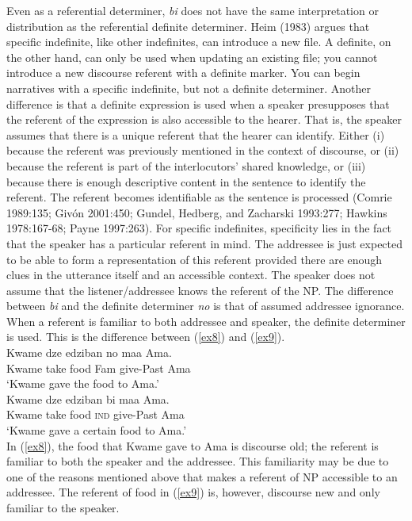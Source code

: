 \documentclass[output=paper,
modfonts
]{langsci/langscibook}
\begin{document}
Even as a referential determiner, \emph{bi} does not have the same interpretation or distribution as the referential definite determiner. Heim (1983) argues that specific indefinite, like other indefinites, can introduce a new file. A definite, on the other hand, can only be used when updating an existing file; you cannot introduce a new discourse referent with a definite marker. You can begin narratives with a specific indefinite, but not a definite determiner. Another difference is that a definite expression is used when a speaker presupposes that the referent of the expression is also accessible to the hearer. That is, the speaker assumes that there is a unique referent that the hearer can identify. Either (i) because the referent was previously mentioned in the context of discourse, or (ii) because the referent is part of the interlocutors’ shared knowledge, or (iii) because there is enough descriptive content in the sentence to identify the referent.  The referent becomes identifiable as the sentence is processed (Comrie 1989:135; Giv\'on 2001:450; Gundel, Hedberg, and Zacharski 1993:277; Hawkins 1978:167-68; Payne 1997:263). For specific indefinites, specificity lies in the fact that the speaker has a particular referent in mind. The addressee is just expected to be able to form a representation of this referent provided there are enough clues in the utterance itself and an accessible context. The speaker does not assume that the listener/addressee knows the referent of the NP. The difference between \emph{bi} and the definite determiner \emph{no} is that of assumed addressee ignorance. When a referent is familiar to both addressee and speaker, the definite determiner is used. This is the difference between (\ref{ex8}) and (\ref{ex9}). 
\ea {}\\
\ea\label{ex8}
\gll  Kwame dze edziban no maa Ama.\\
   Kwame take food Fam give-Past Ama \\ 
\glt `Kwame gave the food to Ama.'\\

\ex\label{ex9} 
\gll Kwame dze edziban bi maa Ama.\\
   Kwame take food \textsc{ind} give-Past Ama \\ 
\glt `Kwame gave a certain food to Ama.'\\
\z \z In (\ref{ex8}), the food that Kwame gave to Ama is discourse old; the referent is familiar to both the speaker and the addressee. This familiarity may be due to one of the reasons mentioned above that makes a referent of NP accessible to an addressee. The referent of food in (\ref{ex9}) is, however, discourse new and only familiar to the speaker.
	 
\end{document}
